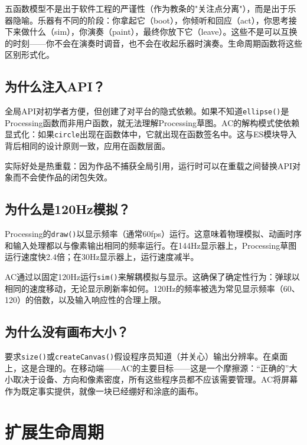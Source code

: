 \documentclass[10pt,letterpaper,twocolumn]{article}
\begin{document}
五函数模型不是出于软件工程的严谨性（作为教条的"关注点分离"），而是出于乐器隐喻。乐器有不同的阶段：你拿起它（boot），你倾听和回应（act），你思考接下来做什么（sim），你演奏（paint），最终你放下它（leave）。这些不是可以互换的时刻——你不会在演奏时调音，也不会在收起乐器时演奏。生命周期函数将这些区别形式化。

\subsection{为什么注入API？}

全局API对初学者方便，但创建了对平台的隐式依赖。如果不知道\texttt{ellipse()}是Processing函数而非用户函数，就无法理解Processing草图。AC的解构模式使依赖显式化：如果\texttt{circle}出现在函数体中，它就出现在函数签名中。这与ES模块导入背后相同的设计原则一致，应用在函数层面。

实际好处是热重载：因为作品不捕获全局引用，运行时可以在重载之间替换API对象而不会使作品的闭包失效。

\subsection{为什么是120Hz模拟？}

Processing的\texttt{draw()}以显示频率（通常60fps）运行。这意味着物理模拟、动画时序和输入处理都以与像素输出相同的频率运行。在144Hz显示器上，Processing草图运行速度快2.4倍；在30Hz显示器上，运行速度减半。

AC通过以固定120Hz运行\texttt{sim()}来解耦模拟与显示。这确保了确定性行为：弹球以相同的速度移动，无论显示刷新率如何。120Hz的频率被选为常见显示频率（60、120）的倍数，以及输入响应性的合理上限。

\subsection{为什么没有画布大小？}

要求\texttt{size()}或\texttt{createCanvas()}假设程序员知道（并关心）输出分辨率。在桌面上，这是合理的。在移动端——AC的主要目标——这是一个摩擦源：``正确的''大小取决于设备、方向和像素密度，所有这些程序员都不应该需要管理。AC将屏幕作为既定事实提供，就像一块已经绷好和涂底的画布。


\section{扩展生命周期}
\label{sec:extended}
\end{document}
